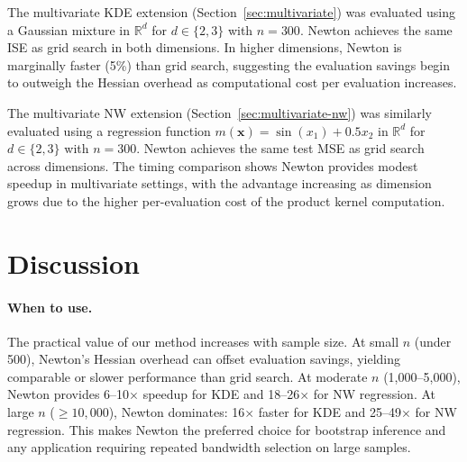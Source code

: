 \documentclass[11pt]{article}
\theoremstyle{definition}
\theoremstyle{remark}
\newcommand{\R}{\mathbb{R}}
\begin{document}
The multivariate KDE extension (Section~\ref{sec:multivariate}) was evaluated using a Gaussian mixture in $\R^d$ for $d \in \{2, 3\}$ with $n=300$.
Newton achieves the same ISE as grid search in both dimensions.
In higher dimensions, Newton is marginally faster (5\%) than grid search, suggesting the evaluation savings begin to outweigh the Hessian overhead as computational cost per evaluation increases.

The multivariate NW extension (Section~\ref{sec:multivariate-nw}) was similarly evaluated using a regression function $m(\mathbf{x}) = \sin(x_1) + 0.5 x_2$ in $\R^d$ for $d \in \{2, 3\}$ with $n=300$.
Newton achieves the same test MSE as grid search across dimensions.
The timing comparison shows Newton provides modest speedup in multivariate settings, with the advantage increasing as dimension grows due to the higher per-evaluation cost of the product kernel computation.

\section{Discussion}
\label{sec:discussion}

\paragraph{When to use.}
The practical value of our method increases with sample size.
At small $n$ (under 500), Newton's Hessian overhead can offset evaluation savings, yielding comparable or slower performance than grid search.
At moderate $n$ (1,000--5,000), Newton provides 6--10$\times$ speedup for KDE and 18--26$\times$ for NW regression.
At large $n$ ($\geq 10{,}000$), Newton dominates: 16$\times$ faster for KDE and 25--49$\times$ for NW regression.
This makes Newton the preferred choice for bootstrap inference and any application requiring repeated bandwidth selection on large samples.
\end{document}
